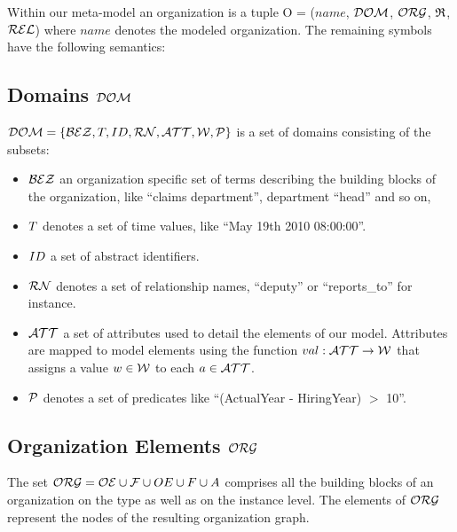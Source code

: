 Within our meta-model an organization is a tuple O = ($name$, $\mathcal{DOM}$, $\mathcal{ORG}$, $\mathfrak{R}$, $\mathcal{REL}$) where $name$ denotes the modeled organization. The remaining symbols have the following semantics:

\subsection{Domains $\mathcal{DOM}$}
	$\mathcal{DOM} = \{ \mathcal{BEZ}, T, ID, \mathcal{RN}, \mathcal{ATT}, \mathcal{W}, \mathcal{P} \} $ is a set
	of domains consisting of the subsets:

	\begin{itemize}

	\item $\mathcal{BEZ}$ an organization specific set of terms describing the building blocks of the
	organization, like "`claims department"', department "`head"' and so on,

	\item $T$ denotes a set of time values, like ``May 19th 2010 08:00:00''.

	\item $ID$ a set of abstract identifiers.

	\item $\mathcal{RN}$ denotes a set of relationship names, "`deputy"' or "`reports\_to"' for instance.

	\item $\mathcal{ATT}$ a set of attributes used to detail the elements of our model. Attributes are mapped to model elements using the function  $val: \mathcal{ATT} \rightarrow \mathcal{W}$ that assigns a value $w \in \mathcal{W}$ to each
	$a \in \mathcal{ATT}$.

	\item	$\mathcal{P}$ denotes a set of predicates like "`(ActualYear - HiringYear) $>$ 10"'.

	\end{itemize}

\subsection{Organization Elements $\mathcal{ORG}$}
	The set $\mathcal{ORG} = \mathcal{OE} \cup \mathcal{F} \cup OE \cup F \cup A $ comprises all the building blocks of an organization on the type as well as on the instance level. The elements of $\mathcal{ORG}$ represent the nodes of the resulting organization graph.

